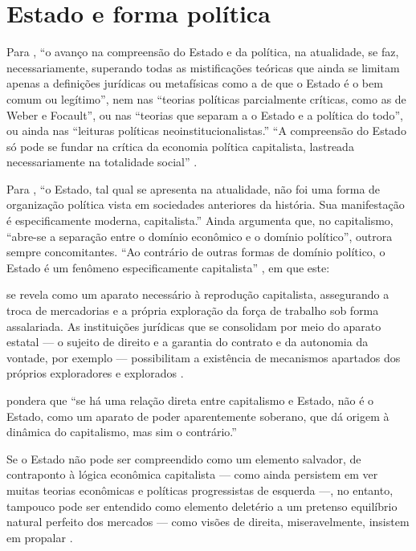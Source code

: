 \documentclass[
	10pt,				%
	openright,			%
	twoside,			%
	a5paper,			%
	english,			%
	french,				%
	spanish,			%
	brazil				%
	]{abntex2}
\renewenvironment{quote}
  {\small\list{}{\rightmargin=0.1cm \leftmargin=4cm}%
   \item\relax}
  {\endlist}
\begin{document}
\section{Estado e forma política}\label{sec:estado_forma_politica}

Para , ``o avanço na compreensão do Estado e
da política, na atualidade, se faz, necessariamente, superando todas as
mistificações teóricas que ainda se limitam apenas a definições
jurídicas ou metafísicas como a de que o Estado é o bem comum ou
legítimo'', nem nas ``teorias políticas parcialmente críticas, como as
de Weber e Focault'', ou nas ``teorias que separam a o Estado e a
política do todo'', ou ainda nas ``leituras políticas
neoinstitucionalistas.'' ``A compreensão do Estado só pode se fundar na
crítica da economia política capitalista, lastreada necessariamente na
totalidade social'' \cite[p.14]{mascaro}.

Para , ``o Estado, tal qual se apresenta na
atualidade, não foi uma forma de organização política vista em
sociedades anteriores da história. Sua manifestação é especificamente
moderna, capitalista.'' Ainda  argumenta que,
no capitalismo, ``abre-se a separação entre o domínio econômico e o
domínio político'', outrora sempre concomitantes. ``Ao contrário de
outras formas de domínio político, o Estado é um fenômeno
especificamente capitalista'' \cite[p.~18]{mascaro}, em que este:

\begin{quote}
se revela como um aparato necessário à reprodução capitalista,
assegurando a troca de mercadorias e a própria exploração da força de
trabalho sob forma assalariada. As instituições jurídicas que se
consolidam por meio do aparato estatal --- o sujeito de direito e a
garantia do contrato e da autonomia da vontade, por exemplo ---
possibilitam a existência de mecanismos apartados dos próprios
exploradores e explorados \cite[p.~18]{mascaro}.
\end{quote}

 pondera que ``se há uma relação direta entre
capitalismo e Estado, não é o Estado, como um aparato de poder
aparentemente soberano, que dá origem à dinâmica do capitalismo, mas sim
o contrário.''

\begin{quote}
Se o Estado não pode ser compreendido como um elemento salvador, de
contraponto à lógica econômica capitalista --- como ainda persistem em
ver muitas teorias econômicas e políticas progressistas de esquerda ---,
no entanto, tampouco pode ser entendido como elemento deletério a um
pretenso equilíbrio natural perfeito dos mercados --- como visões de
direita, miseravelmente, insistem em propalar \cite[p.~115]{mascaro}.
\end{quote}
\end{document}
